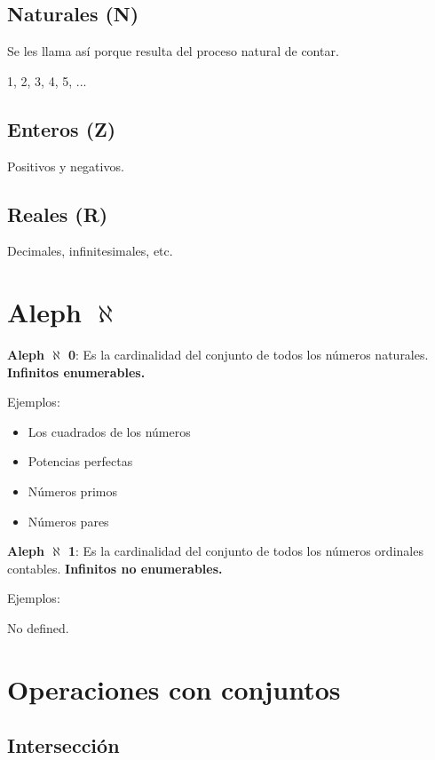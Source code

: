 \documentclass{article}
\begin{document}
\subsection{Naturales (N)}

Se les llama así porque resulta del proceso natural de contar.

1, 2, 3, 4, 5, ...

\subsection{Enteros (Z)}

Positivos y negativos.

\subsection{Reales (R)}

Decimales, infinitesimales, etc.

\section{Aleph $\aleph$}

\textbf{Aleph $\aleph$ 0}:
Es la cardinalidad del conjunto de todos los números naturales.
\textbf{Infinitos enumerables.}
\vspace{1em}

Ejemplos:
\begin{itemize}
	\item
	Los cuadrados de los números
	\item
	Potencias perfectas
	\item
	Números primos
	\item
	Números pares
\end{itemize}

\textbf{Aleph $\aleph$ 1}: Es la cardinalidad del conjunto de todos los números
ordinales contables. \textbf{Infinitos no enumerables.}
\vspace{1em}

Ejemplos:
\vspace{1em}

No defined.

\section{Operaciones con conjuntos}

\subsection{Intersección}
\end{document}

